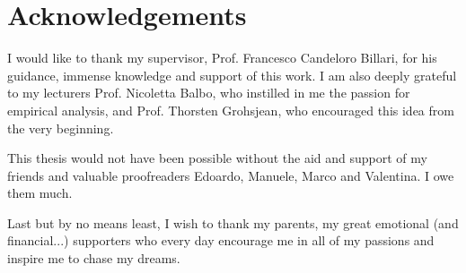 %

\chapter*{Acknowledgements}


I would like to thank my supervisor, Prof. Francesco Candeloro Billari,
for his guidance, immense knowledge and support of this work. I am
also deeply grateful to my lecturers Prof. Nicoletta Balbo, who instilled
in me the passion for empirical analysis, and Prof. Thorsten Grohsjean,
who encouraged this idea from the very beginning.

This thesis would not have been possible without the aid and support
of my friends and valuable proofreaders Edoardo, Manuele, Marco and
Valentina. I owe them much.

Last but by no means least, I wish to thank my parents, my great emotional
(and financial...) supporters who every day encourage me in all of
my passions and inspire me to chase my dreams.\clearpage{}

\mbox{} \thispagestyle{plain} \newpage{}%

